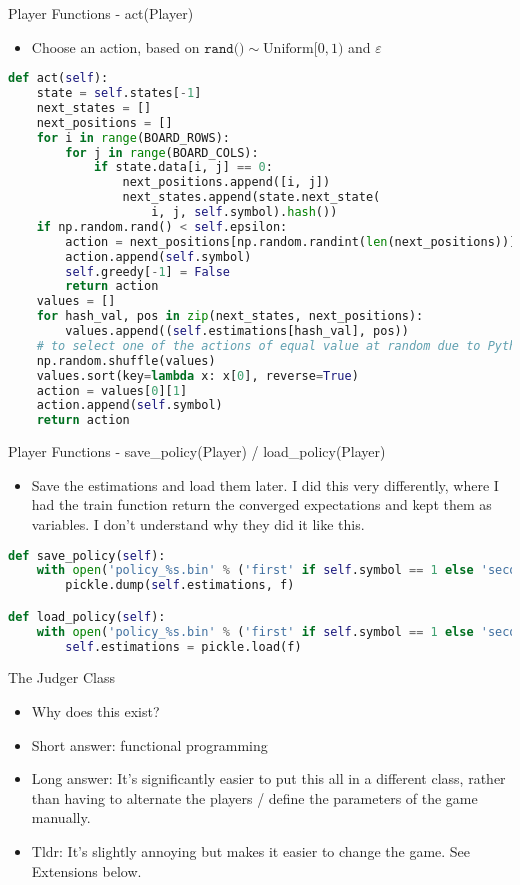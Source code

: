 \documentclass{beamer}
\begin{document}
\begin{frame}[fragile]{Player Functions - act(Player)}
\begin{itemize}
	\item Choose an action, based on $\texttt{rand()}\sim \text{Uniform}[0,1)$ and $\varepsilon$
\end{itemize}
\begin{lstlisting}[language=Python]
def act(self):
    state = self.states[-1]
    next_states = []
    next_positions = []
    for i in range(BOARD_ROWS):
        for j in range(BOARD_COLS):
            if state.data[i, j] == 0:
                next_positions.append([i, j])
                next_states.append(state.next_state(
                    i, j, self.symbol).hash())
    if np.random.rand() < self.epsilon:
        action = next_positions[np.random.randint(len(next_positions))]
        action.append(self.symbol)
        self.greedy[-1] = False
        return action
    values = []
    for hash_val, pos in zip(next_states, next_positions):
        values.append((self.estimations[hash_val], pos))
    # to select one of the actions of equal value at random due to Python's sort is stable
    np.random.shuffle(values)
    values.sort(key=lambda x: x[0], reverse=True)
    action = values[0][1]
    action.append(self.symbol)
    return action
\end{lstlisting}
\end{frame}
\begin{frame}[fragile]{Player Functions - save\_policy(Player) / load\_policy(Player)}
\begin{itemize}
	\item Save the estimations and load them later. I did this very differently, where I had the train function return the converged expectations and kept them as variables. I don't understand why they did it like this.
\end{itemize}
\begin{lstlisting}[language=Python]
def save_policy(self):
    with open('policy_%s.bin' % ('first' if self.symbol == 1 else 'second'), 'wb') as f:
        pickle.dump(self.estimations, f)

def load_policy(self):
    with open('policy_%s.bin' % ('first' if self.symbol == 1 else 'second'), 'rb') as f:
        self.estimations = pickle.load(f)
\end{lstlisting}
\end{frame}
\begin{frame}{The Judger Class}
	\begin{itemize}
		\item Why does this exist?
		\item Short answer: functional programming
		\item Long answer: It's significantly easier to put this all in a different class, rather than having to alternate the players / define the parameters of the game manually. 
		\item Tldr: It's slightly annoying but makes it easier to change the game. See Extensions below.
	\end{itemize}
\end{frame}
\end{document}
